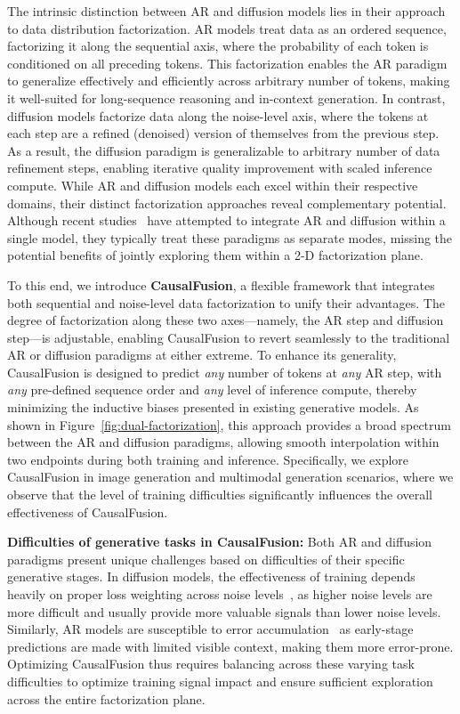 The intrinsic distinction between AR and diffusion models lies in their approach to data distribution factorization. AR models treat data as an ordered sequence, factorizing it along the sequential axis, where the probability of each token is conditioned on all preceding tokens. This factorization enables the AR paradigm to generalize effectively and efficiently across arbitrary number of tokens, making it well-suited for long-sequence reasoning and in-context generation. In contrast, diffusion models factorize data along the noise-level axis, where the tokens at each step are a refined (denoised) version of themselves from the previous step. As a result, the diffusion paradigm is generalizable to arbitrary number of data refinement steps, enabling iterative quality improvement with scaled inference compute. While AR and diffusion models each excel within their respective domains, their distinct factorization approaches reveal complementary potential. Although recent studies~\cite{transfusion,monoformer,dart} have attempted to integrate AR and diffusion within a single model, they typically treat these paradigms as separate modes, missing the potential benefits of jointly exploring them within a 2-D factorization plane.

To this end, we introduce \textbf{CausalFusion}, a flexible framework that integrates both sequential and noise-level data factorization to unify their advantages. The degree of factorization along these two axes—namely, the AR step and diffusion step—is adjustable, enabling {CausalFusion} to revert seamlessly to the traditional AR or diffusion paradigms at either extreme. To enhance its generality, CausalFusion is designed to predict \textit{any} number of tokens at \textit{any} AR step, with \textit{any} pre-defined sequence order and \textit{any} level of inference compute, thereby minimizing the inductive biases presented in existing generative models. As shown in Figure~\ref{fig:dual-factorization}, this approach provides a broad spectrum between the AR and diffusion paradigms, allowing smooth interpolation within two endpoints during both training and inference. 
Specifically, we explore CausalFusion in image generation and multimodal generation scenarios, where we observe that the level of training difficulties significantly influences the overall effectiveness of CausalFusion.

\textbf{Difficulties of generative tasks in CausalFusion:} Both AR and diffusion paradigms present unique challenges based on difficulties of their specific generative stages. In diffusion models, the effectiveness of training depends heavily on proper loss weighting across noise levels~\cite{ddpm,minsnr}, as higher noise levels are more difficult and usually provide more valuable signals than lower noise levels. Similarly, AR models are susceptible to error accumulation~\cite{bengio2015scheduled} as early-stage predictions are made with limited visible context, making them more error-prone. Optimizing CausalFusion thus requires balancing across these varying task difficulties to optimize training signal impact and ensure sufficient exploration across the entire factorization plane.

